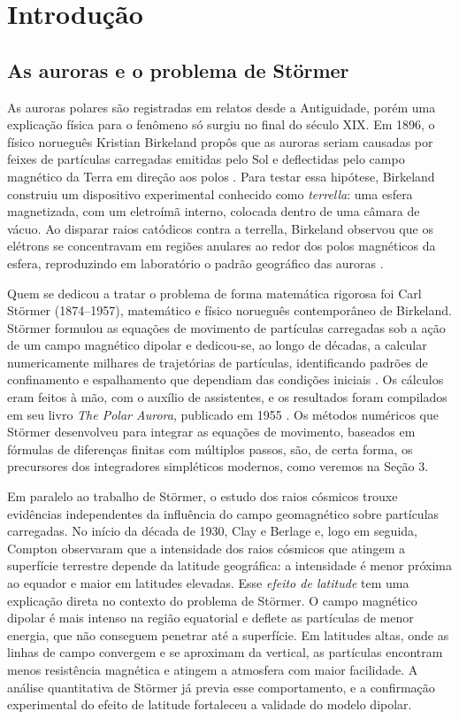 \documentclass[twocolumn]{rbef}
\begin{document}
\section{Introdução}

\subsection{As auroras e o problema de Störmer}

As auroras polares são registradas em relatos desde a Antiguidade, porém uma explicação física para o fenômeno só surgiu no final do século XIX. Em 1896, o físico norueguês Kristian Birkeland propôs que as auroras seriam causadas por feixes de partículas carregadas emitidas pelo Sol e deflectidas pelo campo magnético da Terra em direção aos polos \cite{Birkeland}. Para testar essa hipótese, Birkeland construiu um dispositivo experimental conhecido como \textit{terrella}: uma esfera magnetizada, com um eletroímã interno, colocada dentro de uma câmara de vácuo. Ao disparar raios catódicos contra a terrella, Birkeland observou que os elétrons se concentravam em regiões anulares ao redor dos polos magnéticos da esfera, reproduzindo em laboratório o padrão geográfico das auroras \cite{Birkeland}.

Quem se dedicou a tratar o problema de forma matemática rigorosa foi Carl Störmer (1874--1957), matemático e físico norueguês contemporâneo de Birkeland. Störmer formulou as equações de movimento de partículas carregadas sob a ação de um campo magnético dipolar e dedicou-se, ao longo de décadas, a calcular numericamente milhares de trajetórias de partículas, identificando padrões de confinamento e espalhamento que dependiam das condições iniciais \cite{Stormer, Stormer2}. Os cálculos eram feitos à mão, com o auxílio de assistentes, e os resultados foram compilados em seu livro \textit{The Polar Aurora}, publicado em 1955 \cite{Stormer3}. Os métodos numéricos que Störmer desenvolveu para integrar as equações de movimento, baseados em fórmulas de diferenças finitas com múltiplos passos, são, de certa forma, os precursores dos integradores simpléticos modernos, como veremos na Seção 3.

Em paralelo ao trabalho de Störmer, o estudo dos raios cósmicos trouxe evidências independentes da influência do campo geomagnético sobre partículas carregadas. No início da década de 1930, Clay e Berlage \cite{Clay} e, logo em seguida, Compton \cite{Compton} observaram que a intensidade dos raios cósmicos que atingem a superfície terrestre depende da latitude geográfica: a intensidade é menor próxima ao equador e maior em latitudes elevadas. Esse \textit{efeito de latitude} tem uma explicação direta no contexto do problema de Störmer. O campo magnético dipolar é mais intenso na região equatorial e deflete as partículas de menor energia, que não conseguem penetrar até a superfície. Em latitudes altas, onde as linhas de campo convergem e se aproximam da vertical, as partículas encontram menos resistência magnética e atingem a atmosfera com maior facilidade. A análise quantitativa de Störmer já previa esse comportamento, e a confirmação experimental do efeito de latitude fortaleceu a validade do modelo dipolar.
\end{document}
